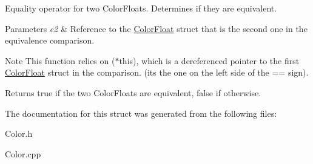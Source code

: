 Equality operator for two Color\+Floats. Determines if they are equivalent. 
\begin{DoxyParams}{Parameters}
{\em c2} & Reference to the \hyperlink{structtsgl_1_1_color_float}{Color\+Float} struct that is the second one in the equivalence comparison. \\
\hline
\end{DoxyParams}
\begin{DoxyNote}{Note}
This function relies on ($\ast$this), which is a dereferenced pointer to the first \hyperlink{structtsgl_1_1_color_float}{Color\+Float} struct in the comparison. (its the one on the left side of the == sign). 
\end{DoxyNote}
\begin{DoxyReturn}{Returns}
true if the two Color\+Floats are equivalent, false if otherwise. 
\end{DoxyReturn}


The documentation for this struct was generated from the following files\+:\begin{DoxyCompactItemize}
\item 
Color.\+h\item 
Color.\+cpp\end{DoxyCompactItemize}
